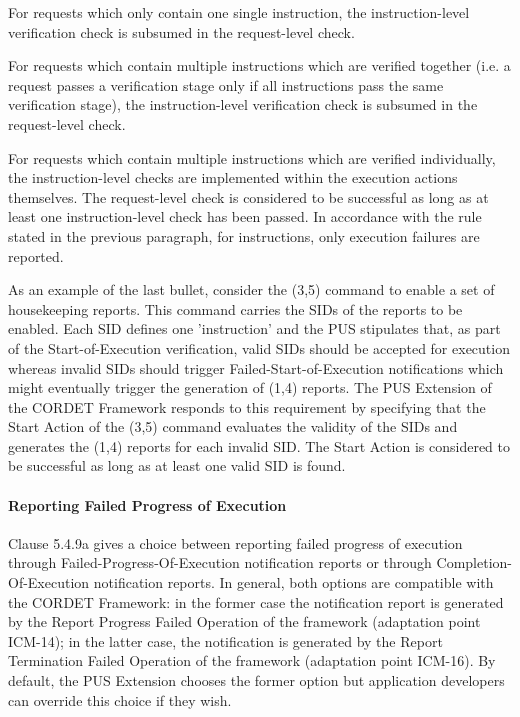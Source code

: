 \documentclass{pnp_article}
\begin{document}
\begin{fw_itemize}
\item For requests which only contain one single instruction, the instruction-level verification check is subsumed in the request-level check.
\item For requests which contain multiple instructions which are verified together (i.e. a request passes a verification stage only if all instructions pass the same verification stage), the instruction-level verification check is subsumed in the request-level check.
\item For requests which contain multiple instructions which are verified individually, the instruction-level checks are implemented within the execution actions themselves. The request-level check is considered to be successful as long as at least one instruction-level check has been passed. In accordance with the rule stated in the previous paragraph, for instructions, only execution failures are reported.
\end{fw_itemize}

As an example of the last bullet, consider the (3,5) command to enable a set of housekeeping reports. This command carries the SIDs of the reports to be enabled. Each SID defines one 'instruction' and the PUS stipulates that, as part of the Start-of-Execution verification, valid SIDs should be accepted for execution whereas invalid SIDs should trigger Failed-Start-of-Execution notifications which might eventually trigger the generation of (1,4) reports. The PUS Extension of the CORDET Framework responds to this requirement by specifying that the Start Action of the (3,5) command evaluates the validity of the SIDs and generates the (1,4) reports for each invalid SID. The Start Action is considered to be successful as long as at least one valid SID is found. 

\paragraph{Reporting Failed Progress of Execution}
Clause 5.4.9a gives a choice between reporting failed progress of execution through Failed-Progress-Of-Execution notification reports or through Completion-Of-Execution notification reports. In general, both options are compatible with the CORDET Framework: in the former case the notification report is generated by the Report Progress Failed Operation of the framework (adaptation point ICM-14); in the latter case, the notification is generated by the Report Termination Failed Operation of the framework (adaptation point ICM-16). By default, the PUS Extension chooses the former option but application developers can override this choice if they wish.
\end{document}
